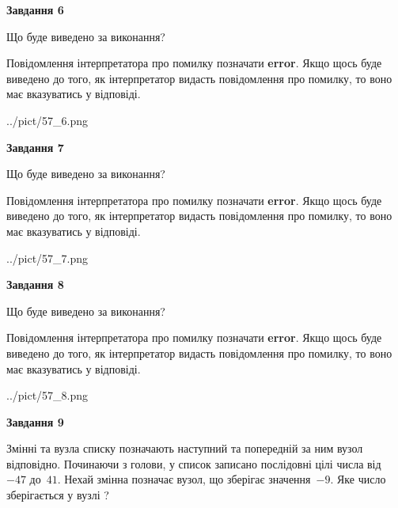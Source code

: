 \documentclass[12pt, ukrainian]{article}
\begin{document}
{\begin {large}
{\begin {center}\textbf{Завдання 6}\end {center}}\par
Що буде виведено за виконання?

Повідомлення інтерпретатора про помилку позначати \textbf{error}.
Якщо щось буде виведено до того, як інтерпретатор видасть повідомлення про помилку, 
то воно має вказуватись у відповіді. \par


\begin{center}
	{../pict/57_6.png}
\end{center}
\newpage

{\begin {center}\textbf{Завдання 7}\end {center}}\par
Що буде виведено за виконання?

Повідомлення інтерпретатора про помилку позначати \textbf{error}.
Якщо щось буде виведено до того, як інтерпретатор видасть повідомлення про помилку, 
то воно має вказуватись у відповіді. \par


\begin{center}
	{../pict/57_7.png}
\end{center}
\newpage

{\begin {center}\textbf{Завдання 8}\end {center}}\par
Що буде виведено за виконання?

Повідомлення інтерпретатора про помилку позначати \textbf{error}.
Якщо щось буде виведено до того, як інтерпретатор видасть повідомлення про помилку, 
то воно має вказуватись у відповіді. \par


\begin{center}
	{../pict/57_8.png}
\end{center}
\newpage

{\begin {center}\textbf{Завдання 9}\end {center}}\par
Змінні  та  вузла списку позначають наступний та попередній за ним вузол відповідно. Починаючи з голови, у список записано послідовні цілі числа від~$-47$ до~$41$. Нехай змінна  позначає вузол, що зберігає значення~$-9$.
Яке число зберігається у вузлі  ?\par
\newpage


\end{large}}
\end{document}
